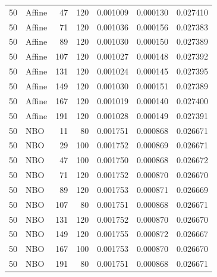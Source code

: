 {\begin{longtable}{rlrrrrr}
50 & Affine & 47 & 120 & 0.001009 & 0.000130 & 0.027410 \\
50 & Affine & 71 & 120 & 0.001036 & 0.000156 & 0.027383 \\
50 & Affine & 89 & 120 & 0.001030 & 0.000150 & 0.027389 \\
50 & Affine & 107 & 120 & 0.001027 & 0.000148 & 0.027392 \\
50 & Affine & 131 & 120 & 0.001024 & 0.000145 & 0.027395 \\
50 & Affine & 149 & 120 & 0.001030 & 0.000151 & 0.027389 \\
50 & Affine & 167 & 120 & 0.001019 & 0.000140 & 0.027400 \\
50 & Affine & 191 & 120 & 0.001028 & 0.000149 & 0.027391 \\
50 & NBO & 11 & 80 & 0.001751 & 0.000868 & 0.026671 \\
50 & NBO & 29 & 100 & 0.001752 & 0.000869 & 0.026671 \\
50 & NBO & 47 & 100 & 0.001750 & 0.000868 & 0.026672 \\
50 & NBO & 71 & 120 & 0.001752 & 0.000870 & 0.026670 \\
50 & NBO & 89 & 120 & 0.001753 & 0.000871 & 0.026669 \\
50 & NBO & 107 & 80 & 0.001751 & 0.000868 & 0.026671 \\
50 & NBO & 131 & 120 & 0.001752 & 0.000870 & 0.026670 \\
50 & NBO & 149 & 120 & 0.001755 & 0.000872 & 0.026667 \\
50 & NBO & 167 & 100 & 0.001753 & 0.000870 & 0.026670 \\
50 & NBO & 191 & 80 & 0.001751 & 0.000868 & 0.026671 \\
\bottomrule\end{longtable}}
